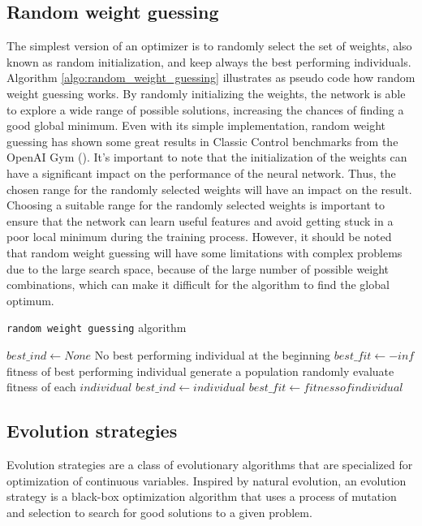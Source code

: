 \subsection{Random weight guessing}
The simplest version of an optimizer is to randomly select the set of weights, also known as random initialization, and keep always the best performing individuals. Algorithm \ref{algo:random_weight_guessing} illustrates as pseudo code  how random weight guessing works. By randomly initializing the weights, the network is able to explore a wide range of possible solutions, increasing the chances of finding a good global minimum. Even with its simple implementation, random weight guessing has shown some great results in Classic Control benchmarks from the OpenAI Gym (\cite{oller_analyzing_2020}). It's important to note that the initialization of the weights can have a significant impact on the performance of the neural network. Thus, the chosen range for the randomly selected weights will have an impact on the result. Choosing a suitable range for the randomly selected weights is important to ensure that the network can learn useful features and avoid getting stuck in a poor local minimum during the training process. However, it should be noted that random weight guessing will have some limitations with complex problems due to the large search space, because of the large number of possible weight combinations, which can make it difficult for the algorithm to find the global optimum.

\begin{algorithm}
\caption{\texttt{random weight guessing} algorithm}
\label{algo:random_weight_guessing}
\begin{algorithmic}[1]
\State $best\_ind \gets None$ \Comment No best performing individual at the beginning
\State $best\_fit \gets -inf$ \Comment fitness of best performing individual
  \State generate a population randomly
  \State evaluate fitness of each $individual$ 
    \State $best\_ind \gets individual$
    \State $best\_fit \gets fitness of individual$
  \EndIf
\EndWhile
\end{algorithmic}
\end{algorithm}


\subsection{Evolution strategies}

Evolution strategies are a class of evolutionary algorithms that are specialized for optimization of continuous variables. Inspired by natural evolution, an evolution strategy is a black-box optimization algorithm that uses a process of mutation and selection to search for good solutions to a given problem. 

